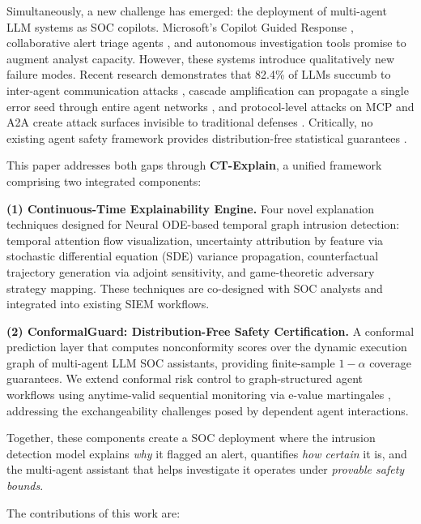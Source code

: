 \documentclass[preprint,review,12pt]{elsarticle}
\begin{document}
Simultaneously, a new challenge has emerged: the deployment of multi-agent LLM systems as SOC copilots. Microsoft's Copilot Guided Response \cite{microsoft_cgr_2024}, collaborative alert triage agents \cite{cortex_agents_2025}, and autonomous investigation tools promise to augment analyst capacity. However, these systems introduce qualitatively new failure modes. Recent research demonstrates that 82.4\% of LLMs succumb to inter-agent communication attacks \cite{dark_side_llm_agents_2025}, cascade amplification can propagate a single error seed through entire agent networks \cite{spark_to_fire_2026}, and protocol-level attacks on MCP and A2A create attack surfaces invisible to traditional defenses \cite{breaking_mcp_2026}. Critically, no existing agent safety framework provides distribution-free statistical guarantees \cite{agentarmor_2025, clawguard_2025}.

This paper addresses both gaps through \textbf{CT-Explain}, a unified framework comprising two integrated components:

\textbf{(1) Continuous-Time Explainability Engine.} Four novel explanation techniques designed for Neural ODE-based temporal graph intrusion detection: temporal attention flow visualization, uncertainty attribution by feature via stochastic differential equation (SDE) variance propagation, counterfactual trajectory generation via adjoint sensitivity, and game-theoretic adversary strategy mapping. These techniques are co-designed with SOC analysts and integrated into existing SIEM workflows.

\textbf{(2) ConformalGuard: Distribution-Free Safety Certification.} A conformal prediction layer that computes nonconformity scores over the dynamic execution graph of multi-agent LLM SOC assistants, providing finite-sample $1-\alpha$ coverage guarantees. We extend conformal risk control \cite{angelopoulos_crc_2024} to graph-structured agent workflows using anytime-valid sequential monitoring via e-value martingales \cite{ville_inequality}, addressing the exchangeability challenges posed by dependent agent interactions.

Together, these components create a SOC deployment where the intrusion detection model explains \textit{why} it flagged an alert, quantifies \textit{how certain} it is, and the multi-agent assistant that helps investigate it operates under \textit{provable safety bounds}.

The contributions of this work are:
\end{document}
